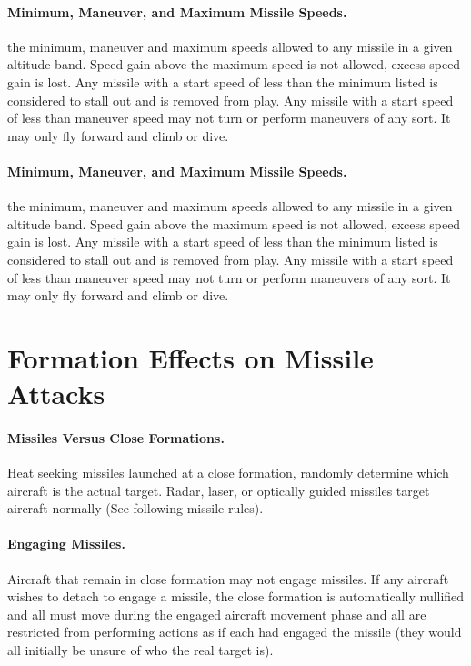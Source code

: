 \begin{advancedrules}
\paragraph{Minimum, Maneuver, and Maximum Missile Speeds.}  the minimum, maneuver and maximum speeds allowed to any missile in a given altitude band. Speed gain above the maximum speed is not allowed, excess speed gain is lost. Any missile with a start speed of less than the minimum listed is considered to stall out and is removed from play. Any missile with a start speed of less than maneuver speed may not turn or perform maneuvers of any sort. It may only fly forward and climb or dive.

\paragraph{Minimum, Maneuver, and Maximum Missile Speeds.}  the minimum, maneuver and maximum speeds allowed to any missile in a given altitude band. Speed gain above the maximum speed is not allowed, excess speed gain is lost. Any missile with a start speed of less than the minimum listed is considered to stall out and is removed from play. Any missile with a start speed of less than maneuver speed may not turn or perform maneuvers of any sort. It may only fly forward and climb or dive.

\section{Formation Effects on Missile Attacks}

\paragraph{Missiles Versus Close Formations.} Heat seeking missiles launched at a close formation, randomly determine which aircraft is the actual target. Radar, laser, or optically guided missiles target aircraft normally (See following missile rules).

\paragraph{Engaging Missiles.} Aircraft that remain in close formation may not engage missiles. If any aircraft wishes to detach to engage a missile, the close formation is automatically nullified and all must move during the engaged aircraft movement phase and all are restricted from performing actions as if each had engaged the missile (they would all initially be unsure of who the real target is).

\end{advancedrules}
